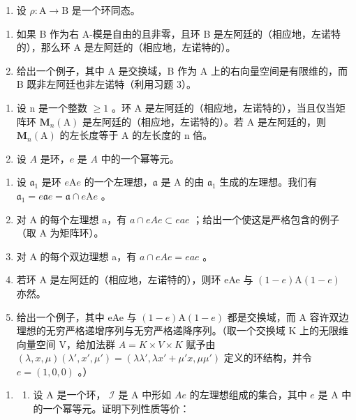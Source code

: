 \begin{enumerate}
\def\labelenumi{\arabic{enumi})}
\setcounter{enumi}{3}
\tightlist
\item
  设 \(\rho : \mathrm{A} \to \mathrm{B}\) 是一个环同态。
\end{enumerate}

\begin{enumerate}
\def\labelenumi{\alph{enumi})}
\item
  如果 B 作为右 A-模是自由的且非零，且环 B 是左阿廷的（相应地，左诺特的），那么环 A 是左阿廷的（相应地，左诺特的）。
\item
  给出一个例子，其中 A 是交换域，B 作为 A 上的右向量空间是有限维的，而 B 既非左阿廷也非左诺特（利用习题 3）。
\end{enumerate}

\begin{enumerate}
\def\labelenumi{\arabic{enumi})}
\setcounter{enumi}{4}
\item
  设 n 是一个整数 \(\geqslant 1\) 。环 A 是左阿廷的（相应地，左诺特的），当且仅当矩阵环 \(\mathbf{M}_{n}(\mathrm{A})\) 是左阿廷的（相应地，左诺特的）。若 A 是左阿廷的，则 \(\mathbf{M}_{n}(\mathrm{A})\) 的左长度等于 A 的左长度的 n 倍。
\item
  设 \(A\) 是环，\(e\) 是 \(A\) 中的一个幂等元。
\end{enumerate}

\begin{enumerate}
\def\labelenumi{\alph{enumi})}
\item
  设 \(\mathfrak{a}_1\) 是环 \(e\mathrm{A}e\) 的一个左理想，\(\mathfrak{a}\) 是 A 的由 \(\mathfrak{a}_1\) 生成的左理想。我们有 \(\mathfrak{a}_1 = e\mathfrak{a}e = \mathfrak{a} \cap e\mathrm{A}e\) 。
\item
  对 A 的每个左理想 a，有 \(a \cap eAe \subset eae\) ；给出一个使这是严格包含的例子（取 A 为矩阵环）。
\item
  对 A 的每个双边理想 a，有 \(a \cap eAe = eae\) 。
\item
  若环 A 是左阿廷的（相应地，左诺特的），则环 eAe 与 \((1-e)\mathrm{A}(1-e)\) 亦然。
\item
  给出一个例子，其中 eAe 与 \((1-e)\mathrm{A}(1-e)\) 都是交换域，而 A 容许双边理想的无穷严格递增序列与无穷严格递降序列。（取一个交换域 K 上的无限维向量空间 V，给加法群 \(A=K\times V\times K\) 赋予由 \((\lambda,x,\mu)(\lambda',x',\mu')=(\lambda\lambda',\lambda x'+\mu'x,\mu\mu')\) 定义的环结构，并令 \(e=(1,0,0)\) 。）
\end{enumerate}

\begin{enumerate}
\def\labelenumi{\arabic{enumi})}
\setcounter{enumi}{6}
\tightlist
\item
  \begin{enumerate}
  \def\labelenumii{\alph{enumii})}
  \tightlist
  \item
    设 A 是一个环， \(\mathcal{I}\) 是 A 中形如 \(Ae\) 的左理想组成的集合，其中 \(e\) 是 A 中的一个幂等元。证明下列性质等价：
  \end{enumerate}
\end{enumerate}

